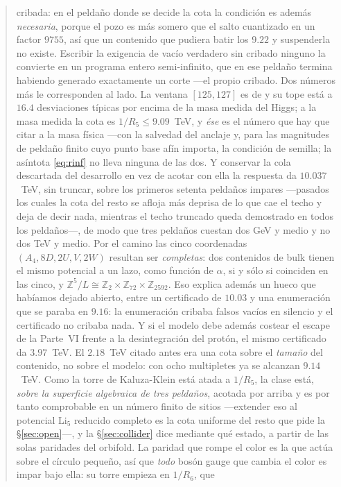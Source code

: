 \documentclass[11pt,a4paper]{article}
\newcommand{\ZZ}{\mathbb{Z}}
\begin{document}
\begin{abstract}
cribada: en el peldaño donde se decide la cota la condición es además \emph{necesaria}, porque el
pozo es más somero que el salto cuantizado en un factor $9755$, así que un contenido que pudiera
batir los $9.22$ y suspenderla no existe. Escribir la exigencia de vacío verdadero sin cribado
ninguno la convierte en un programa entero semi-infinito, que en ese peldaño termina habiendo
generado exactamente un corte ---el propio cribado. Dos números más le corresponden al lado. La
ventana $[125,127]$ es de \cite{KM25} y su tope está a $16.4$ desviaciones típicas por encima de la
masa medida del Higgs; a la masa medida la cota es $1/R_5\le9.09$~TeV, y \emph{ése} es el número
que hay que citar a la masa física ---con la salvedad del anclaje y, para las magnitudes de
peldaño finito cuyo punto base afín importa, la condición de semilla; la asíntota
\eqref{eq:rinf} no lleva ninguna de las dos. Y conservar la cola descartada del
desarrollo en vez de acotar con ella la respuesta da $10.037$~TeV, sin truncar, sobre los primeros
setenta peldaños impares ---pasados los cuales la cota del resto se afloja más deprisa de lo que
cae el techo y deja de decir nada, mientras el techo truncado queda demostrado en todos los
peldaños---, de modo que tres peldaños cuestan dos GeV y medio y no dos TeV y medio. Por el camino
las cinco coordenadas $(A_4,8D,2U,V,2W)$ resultan ser \emph{completas}: dos contenidos de bulk
tienen el mismo potencial a un lazo, como función de $\alpha$, si y sólo si coinciden en las cinco,
y $\ZZ^5/L\cong\ZZ_2\times\ZZ_{72}\times\ZZ_{2592}$. Eso explica además un hueco que habíamos dejado abierto, entre un certificado
de $10.03$ y una enumeración que se paraba en $9.16$: la enumeración cribaba falsos vacíos en
silencio y el certificado no cribaba nada. Y si el
modelo debe además costear el escape de la Parte~VI frente a la desintegración del protón, el mismo
certificado da $3.97$~TeV. El $2.18$~TeV citado antes era una cota sobre el \emph{tamaño} del
contenido, no sobre el modelo: con ocho multipletes ya se alcanzan $9.14$~TeV. Como la torre de
Kaluza-Klein está atada a $1/R_5$, la clase está, \emph{sobre la superficie algebraica de tres
peldaños}, acotada por arriba y es por tanto comprobable en un número finito de sitios ---extender
eso al potencial $\mathrm{Li}_5$ reducido completo es la cota uniforme del resto que pide la
\S\ref{sec:open}---, y la \S\ref{sec:collider} dice mediante qué estado, a partir de las solas
paridades del orbifold. La paridad que rompe el color es la que actúa sobre el círculo pequeño, así que
\emph{todo} bosón gauge que cambia el color es impar bajo ella: su torre empieza en $1/R_6$, que

\end{abstract}
\end{document}
